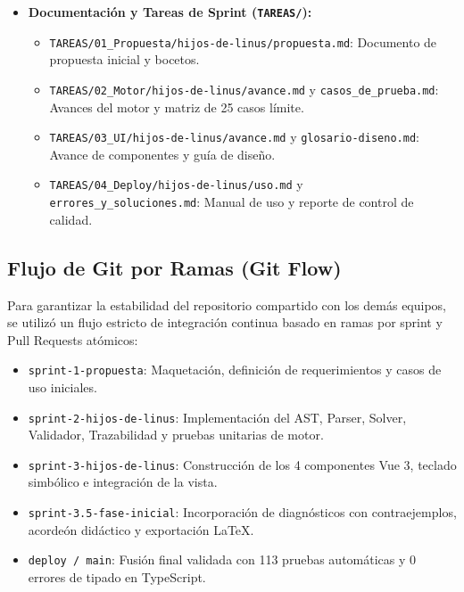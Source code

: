 \documentclass[11pt,a4paper]{article}
\begin{document}
\begin{itemize}[leftmargin=1.2cm]
\begin{itemize}
    \end{itemize}
    \item \textbf{Documentación y Tareas de Sprint (\texttt{TAREAS/}):}
    \begin{itemize}
        \item \texttt{TAREAS/01\_Propuesta/hijos-de-linus/propuesta.md}: Documento de propuesta inicial y bocetos.
        \item \texttt{TAREAS/02\_Motor/hijos-de-linus/avance.md} y \texttt{casos\_de\_prueba.md}: Avances del motor y matriz de 25 casos límite.
        \item \texttt{TAREAS/03\_UI/hijos-de-linus/avance.md} y \texttt{glosario-diseno.md}: Avance de componentes y guía de diseño.
        \item \texttt{TAREAS/04\_Deploy/hijos-de-linus/uso.md} y \texttt{errores\_y\_soluciones.md}: Manual de uso y reporte de control de calidad.
    \end{itemize}
\end{itemize}

\subsection{Flujo de Git por Ramas (Git Flow)}
Para garantizar la estabilidad del repositorio compartido con los demás equipos, se utilizó un flujo estricto de integración continua basado en ramas por sprint y Pull Requests atómicos:

\begin{itemize}[leftmargin=1.2cm]
    \item \texttt{sprint-1-propuesta}: Maquetación, definición de requerimientos y casos de uso iniciales.
    \item \texttt{sprint-2-hijos-de-linus}: Implementación del AST, Parser, Solver, Validador, Trazabilidad y pruebas unitarias de motor.
    \item \texttt{sprint-3-hijos-de-linus}: Construcción de los 4 componentes Vue 3, teclado simbólico e integración de la vista.
    \item \texttt{sprint-3.5-fase-inicial}: Incorporación de diagnósticos con contraejemplos, acordeón didáctico y exportación \LaTeX.
    \item \texttt{deploy / main}: Fusión final validada con 113 pruebas automáticas y 0 errores de tipado en TypeScript.
\end{itemize}

\newpage
\end{document}
